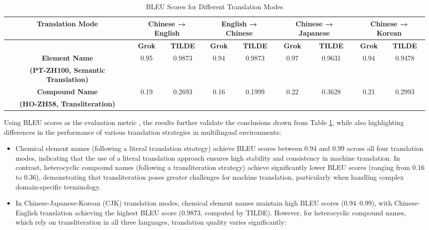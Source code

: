 \documentclass[conference]{IEEEtran}
\begin{document}
\begin{CJK*}{UTF8}{gbsn}
\begin{table}[h!]%
\centering
\caption{BLEU Scores for Different Translation Modes}
\label{tab:bleu_translation_modes}
\begin{tabular}{ccccccccc}
\hline
\textbf{Translation Mode} & \multicolumn{2}{c}{\textbf{Chinese → English}} & \multicolumn{2}{c}{\textbf{English → Chinese}} & \multicolumn{2}{c}{\textbf{Chinese → Japanese}} & \multicolumn{2}{c}{\textbf{Chinese → Korean}} \\
\hline
 & \textbf{Grok} & \textbf{TILDE} & \textbf{Grok} & \textbf{TILDE} & \textbf{Grok} & \textbf{TILDE} & \textbf{Grok} & \textbf{TILDE} \\
\hline
\textbf{Element Name} & 0.95 & 0.9873 & 0.94 & 0.9873 & 0.97 & 0.9631 & 0.94 & 0.9478 \\
\textbf{(PT-ZH100, Semantic Translation)} & & & & & & & & \\

\textbf{Compound Name} & 0.19 & 0.2693 & 0.16 & 0.1999 & 0.22 & 0.3628 & 0.21 & 0.2993 \\
\textbf{(HO-ZH58, Transliteration)} & & & & & & & & \\
\hline
\end{tabular}
\end{table}


Using BLEU scores as the evaluation metric \cite{chauhan2023comprehensive}, the results further validate the conclusions drawn from Table \ref{tab:bleu_translation_modes}, while also highlighting differences in the performance of various translation strategies in multilingual environments:
\begin{itemize}
    
\item Chemical element names (following a literal translation strategy) achieve BLEU scores between 0.94 and 0.99 across all four translation modes, indicating that the use of a literal translation approach ensures high stability and consistency in machine translation. In contrast, heterocyclic compound names (following a transliteration strategy) achieve significantly lower BLEU scores (ranging from 0.16 to 0.36), demonstrating that transliteration poses greater challenges for machine translation, particularly when handling complex domain-specific terminology. %

\item In Chinese-Japanese-Korean (CJK) translation modes, chemical element names maintain high BLEU scores (0.94–0.99), with Chinese-English translation achieving the highest BLEU score (0.9873, computed by TILDE). However, for heterocyclic compound names, which rely on transliteration in all three languages, translation quality varies significantly:
\begin{itemize}
    

\end{itemize}
\end{itemize}
\end{CJK*}
\end{document}
